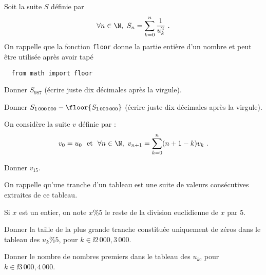 \medskip

Soit la suite $S$ définie par 
\begin{equation*}
  \forall n \in \N,~ S_n = \sum_{k=0}^n \dfrac{1}{u_k^2}~.
\end{equation*}
On rappelle que la fonction \texttt{floor} donne la partie entière d'un nombre et peut être utilisée après avoir tapé 
\begin{lstlisting}
  from math import floor
\end{lstlisting}

\medskip

\question{} Donner $S_{987}$ (écrire juste dix décimales après la virgule).

\medskip

\question{} Donner $S_{1\,000\,000} - \floor{S_{1\,000\,000}}$ (écrire juste dix décimales après la virgule).

\medskip

On considère la suite $v$ définie par :
\begin{equation*}
  v_0 = u_0 ~\textrm{ et }~ \forall n \in \N,~v_{n+1} = \sum_{k=0}^n (n+1-k) v_k~.
\end{equation*}

\question{} Donner $v_{15}$.

\medskip

On rappelle qu'une tranche d'un tableau est une suite de valeurs consécutives extraites de ce tableau. 

Si $x$ est un entier, on note $x \% 5$ le reste de la division euclidienne de $x$ par $5$.

\medskip

\question{} Donner la taille de la plus grande tranche constituée uniquement de zéros dans le tableau des $u_k \% 5$, pour $k \in \ii{2\,000,3\,000}$.

\medskip 

\question{} Donner le nombre de nombres premiers dans le tableau des $u_k$, pour $k \in \ii{3\,000,4\,000}$.